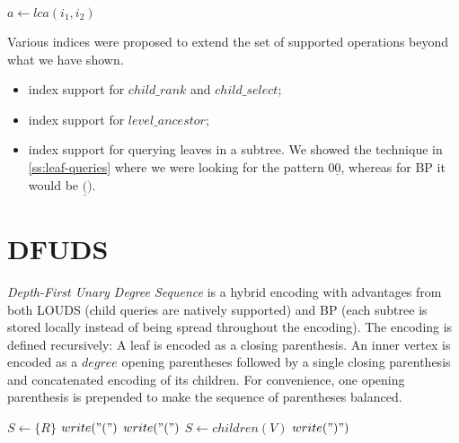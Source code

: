 \begin{algorithmic}
	\State $a \gets lca(i_1, i_2)$
	\State {}
\EndFunction
\end{algorithmic}

\begin{algorithmic}
	\State {}
\EndFunction
\end{algorithmic}

\begin{algorithmic}
	\State {}
\EndFunction
\end{algorithmic}

\bigskip

Various indices were proposed to extend the set of supported operations beyond what we have shown.
\begin{itemize}
	\item index support for $child\_rank$ and $child\_select$;
	\item index support for $level\_ancestor$;
	\item index support for querying leaves in a subtree.
	We showed the technique in \ref{ss:leaf-queries} where we were looking for the pattern $0\underline{0}$, whereas for BP it would be $\underline{(})$.
\end{itemize}

\section{DFUDS}

\emph{Depth-First Unary Degree Sequence} is a hybrid encoding with advantages from both LOUDS (child queries are natively supported) and BP (each subtree is stored locally instead of being spread throughout the encoding).
The encoding is defined recursively:
A leaf is encoded as a closing parenthesis.
An inner vertex is encoded as a $degree$ opening parentheses followed by a single closing parenthesis and concatenated encoding of its children.
For convenience, one opening parenthesis is prepended to make the sequence of parentheses balanced.


\begin{algorithmic}
	\State $S \gets \{R\}$ 
	\State $write("(")$
				\State $write("(")$
			\EndFor
			\State $ S \gets children(V)$
			\State $write(")")$
	\EndWhile
\EndFunction
\end{algorithmic}

